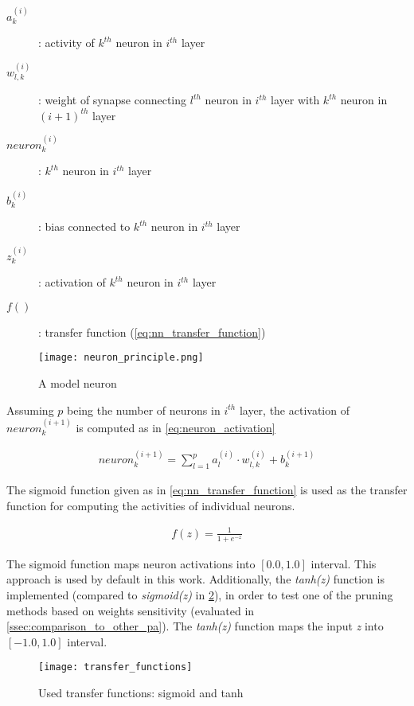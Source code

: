 \begin{description}
\item[$ a_k^{(i)} $] : activity of $ k^{th} $ neuron in $ i^{th} $ layer
\item[$ w_{l, k}^{(i)} $] : weight of synapse connecting $ l^{th} $ neuron in $ i^{th} $ layer with $ k^{th} $ neuron in $ (i+1)^{th} $ layer
\item[$ neuron_k^{(i)} $] : $ k^{th} $ neuron in $ i^{th} $ layer
\item[$ b_k^{(i)} $] : bias connected to $ k^{th} $ neuron in $ i^{th} $ layer
\item[$ z_k^{(i)} $] : activation of $ k^{th} $ neuron in $ i^{th} $ layer
\item[$ f() $] : transfer function (\cref{eq:nn_transfer_function})
\end{description}

\begin{figure}[H]
  \centering
  \texttt{[image: neuron\_principle.png]}
  \caption{A model neuron}
  \label{img:model_neuron}
\end{figure}

Assuming $ p $ being the number of neurons in $ i^{th} $ layer, the activation of $ neuron_k^{(i+1)} $ is computed as in \ref{eq:neuron_activation}

\begin{align} \label{eq:neuron_activation}
neuron_k^{(i+1)} = \displaystyle{\sum_{l=1}^{p} a_l^{(i)} \cdot w_{l,k}^{(i)}} + b_k^{(i+1)}
\end{align}

The sigmoid function given as in \cref{eq:nn_transfer_function} is used as the transfer function for computing the activities of individual neurons.

\begin{align} \label{eq:nn_transfer_function}
f(z) = \frac{1}{1 + e^{-z}}
\end{align}

The sigmoid function maps neuron activations into $ [0.0, 1.0] $ interval. This approach is used by default in this work. Additionally, the \textit{tanh(z)} function is implemented (compared to \textit{sigmoid(z)} in \cref{fig:transfer_functions}), in order to test one of the pruning methods based on weights sensitivity (evaluated in \cref{ssec:comparison_to_other_pa}). The \textit{tanh(z)} function maps the input \textit{z} into $ [-1.0, 1.0] $ interval.

\begin{figure}[H]
  \centering
  \texttt{[image: transfer\_functions]}
  \caption{Used transfer functions: sigmoid and tanh}
  \label{fig:transfer_functions}
\end{figure}

